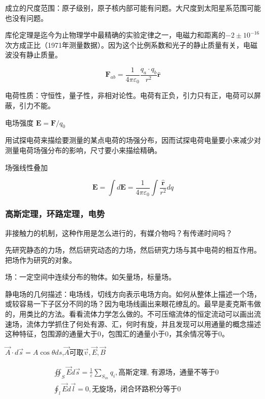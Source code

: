 成立的尺度范围：原子级别，原子核内部可能有问题。大尺度到太阳星系范围可能也没有问题。

库伦定理是迄今为止物理学中最精确的实验定律之一，电磁力和距离的$-2 \pm 10^{-16}$次方成正比（1971年测量数据）。因为这个比例系数和光子的静止质量有关，电磁波没有静止质量。

\begin{displaymath}
    \boldsymbol F_{ab} = \frac{1}{4 \pi \varepsilon _0} \frac{q_a \cdot q_b}{r^2} \boldsymbol {\hat{r} } 
\end{displaymath}

电荷性质：守恒性，量子性，非相对论性。电荷有正负，引力只有正，电荷可以屏蔽，引力不能。

电场强度 $\boldsymbol E = \boldsymbol F / q_0$

用试探电荷来描绘要测量的某点电荷的场强分布，因而试探电荷电量要小来减少对测量电荷场强分布的影响，尺寸要小来描绘精确。

场强线性叠加 

$$\boldsymbol E =  \int d \boldsymbol E
= \frac{1}{4 \pi \varepsilon _0} \int \frac{\boldsymbol {\hat{r} } }{r^2} dq $$

\subsubsection{高斯定理，环路定理，电势}

非接触力的机制，这种作用是怎么进行的，有媒介物吗？有传递时间吗？

先研究静态的力场，然后研究动态的力场，然后研究力场与其中电荷的相互作用。把场作为研究的对象。

场：一定空间中连续分布的物体。如矢量场，标量场。

静电场的几何描述：电场线，切线方向表示电场方向。如何从整体上描述一个场，或较容易一下子区分不同的场？因为电场线画出来眼花缭乱的。最早是麦克斯韦做的，用类比的方法。看看流体力学怎么做的。不可压缩流体的恒定流动可以画出流速场，流体力学抓住了何处有源、汇，何时有旋，并且发现可以用通量的概念描述这种特征，包围源的通量大于0，包围汇的通量小于0，其余情况等于0。

$ \vec{A} \cdot d \vec{s} = A \cos \theta ds $,$\vec{A}$可取$\vec{v},\vec{E},\vec{B}$ 

\begin{equation}
\begin{split}
    &\oiint _S  \vec{E}d \vec{s}  = \frac{1}{\varepsilon} \sum_{S_{in}} q_i,
    \mbox{高斯定理, 有源场，通量不等于0}\\
    &\oint _l  \vec{E}d \vec{l}  = 0,
    \mbox{无旋场，闭合环路积分等于0}\\
\end{split}
\end{equation}

